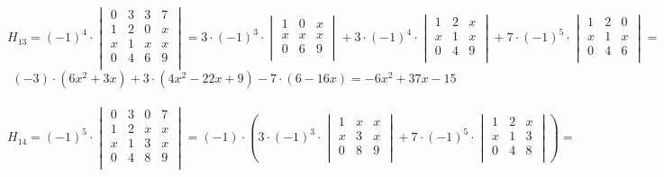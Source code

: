 \documentclass[a4paper, 12pt]{article}
\begin{document}
    \\
    \[
        H_{13} = (-1)^4 \cdot \begin{vmatrix}
            0 & 3 & 3 & 7 \\
            1 & 2 & 0 & x \\
            x & 1 & x & x \\
            0 & 4 & 6 & 9 \\
        \end{vmatrix} = 3 \cdot (-1)^3 \cdot \begin{vmatrix}
            1 & 0 & x \\
            x & x & x \\
            0 & 6 & 9 \\
        \end{vmatrix} + 3 \cdot (-1)^4 \cdot \begin{vmatrix}
            1 & 2 & x \\
            x & 1 & x \\
            0 & 4 & 9 \\
        \end{vmatrix} + 7 \cdot (-1)^5 \cdot \begin{vmatrix}
            1 & 2 & 0 \\
            x & 1 & x \\
            0 & 4 & 6 \\
        \end{vmatrix} = 
    \]
    \[
        (-3) \cdot (6x^2 + 3x) + 3 \cdot (4 x^{2} - 22 x + 9) - 7 \cdot (6 - 16 x) = - 6 x^{2} + 37 x - 15
    \]
    \\
    \[
        H_{14} = (-1)^5 \cdot \begin{vmatrix}
            0 & 3 & 0 & 7 \\
            1 & 2 & x & x \\
            x & 1 & 3 & x \\
            0 & 4 & 8 & 9 \\
        \end{vmatrix} = (-1) \cdot (3 \cdot (-1)^3 \cdot \begin{vmatrix}
            1 & x & x \\
            x & 3 & x \\
            0 & 8 & 9 \\
        \end{vmatrix} + 7 \cdot (-1)^5 \cdot \begin{vmatrix}
            1 & 2 & x \\
            x & 1 & 3 \\
            0 & 4 & 8 \\
        \end{vmatrix}) =    
    \]
\end{document}
